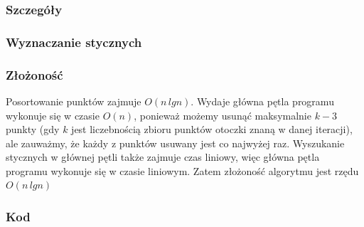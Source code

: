\documentclass[11pt]{article}
\theoremstyle{remark} \newtheorem{definition}{def.}
\theoremstyle{definition} \newtheorem{twierdzenie}{tw.}
\begin{document}
    \subsubsection{Szczegóły}
        \subsubsection*{Wyznaczanie stycznych}

        
        
    \subsubsection{Złożoność}
        Posortowanie punktów zajmuje $O(n \, lgn)$. Wydaje główna pętla programu wykonuje się w czasie $O(n)$, ponieważ możemy usunąć maksymalnie $k-3$ punkty (gdy $k$ jest liczebnością 
        zbioru punktów otoczki znaną w danej iteracji), ale zauważmy, że każdy z punktów usuwany jest co najwyżej raz. Wyszukanie stycznych w głównej pętli także zajmuje 
        czas liniowy, więc główna pętla programu wykonuje się w czasie liniowym. Zatem złożoność algorytmu jest rzędu $O(n \, lgn)$\\

    \subsubsection{Kod}
\end{document}
